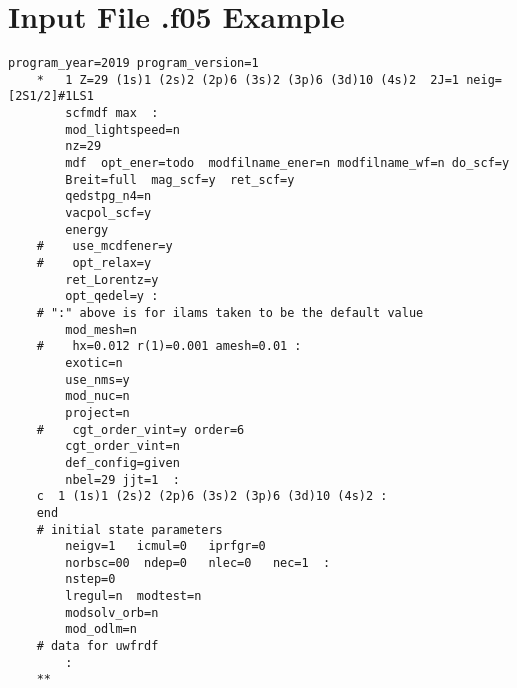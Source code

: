 
%

\chapter{Input File .f05 Example} \label{an:input}

\begin{lstlisting}[language=FORTRAN]
    program_year=2019 program_version=1
    *   1 Z=29 (1s)1 (2s)2 (2p)6 (3s)2 (3p)6 (3d)10 (4s)2  2J=1 neig=[2S1/2]#1LS1
        scfmdf max  :
        mod_lightspeed=n
        nz=29
        mdf  opt_ener=todo  modfilname_ener=n modfilname_wf=n do_scf=y     
        Breit=full  mag_scf=y  ret_scf=y
        qedstpg_n4=n
        vacpol_scf=y
        energy
    #    use_mcdfener=y
    #    opt_relax=y                                                         
        ret_Lorentz=y
        opt_qedel=y :
    # ":" above is for ilams taken to be the default value
        mod_mesh=n
    #    hx=0.012 r(1)=0.001 amesh=0.01 :
        exotic=n
        use_nms=y
        mod_nuc=n
        project=n
    #    cgt_order_vint=y order=6
        cgt_order_vint=n
        def_config=given
        nbel=29 jjt=1  :
    c  1 (1s)1 (2s)2 (2p)6 (3s)2 (3p)6 (3d)10 (4s)2 :
    end
    # initial state parameters
        neigv=1   icmul=0   iprfgr=0
        norbsc=00  ndep=0   nlec=0   nec=1  :
        nstep=0
        lregul=n  modtest=n
        modsolv_orb=n
        mod_odlm=n
    # data for uwfrdf
        :
    **
\end{lstlisting}